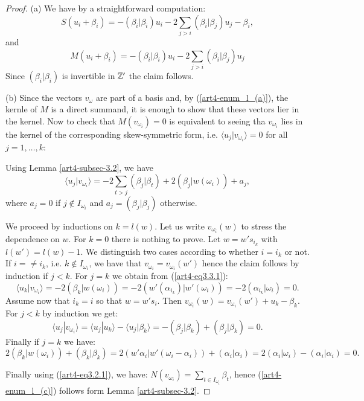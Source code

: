 \begin{proof}
(a) We have by a straightforward computation:
$$
S(u_{i} + \beta_{i}) = - (\beta_{i} | \beta_{i})u_{i}-2 \sum\limits_{j>i}(\beta_{i}|\beta_{j})u_{j}- \beta_{i},
$$
and
$$
M(u_{i} + \beta_{i}) = - (\beta_{i} | \beta_{i})u_{i}-2 \sum\limits_{j>i}(\beta_{i}|\beta_{j})u_{j}
$$
Since $(\beta_{i} | \beta_{i})$ is invertible in $\mathbb{Z}'$ the claim follows.

(b) Since the vectors $v_{\omega}$ are part of a basis and, by (\ref{art4-enum_l_(a)}), the kernle of $M$ is a direct summand, it is enough to show that these vectors lier in the kernel. Now to check that $M(v_{\omega_{i}}) =0$ is equivalent to seeing tha $v_{\omega_{i}}$ lies in the kernel of the corresponding skew-symmetric form, i.e. $\langle u_{j} | v_{\omega_{i}}\rangle = 0$ for all $j = 1,\ldots, k$:

Using Lemma \ref{art4-subsec-3.2}, we have
\begin{equation}
\langle u_{j} | v_{\omega_{i}}\rangle = -2\sum\limits_{t > j}(\beta_{j} | \beta_{t}) + 2(\beta_{j}| w(\omega_{i})) + a_{j},\label{art4-eq3.3.1}
\end{equation}
where $a_{j} = 0$ if $j \not\in I_{\omega_{i}}$ and $a_{j} = (\beta_{j} | \beta_{j})$ otherwise.

We proceed by inductions on $k= l(w)$. Let us write $v_{\omega_{i}}(w)$ to stress the dependence on $w$. For $k=0$ there is nothing to prove. Let $w=w's_{i_{k}}$ with $l(w')=l(w)-1$. We distinguish two cases according to whether $i=i_{k}$ or not. If $i=\neq i_{k}$, i.e. $k\not\in I_{\omega_{i}}$, we have that $v_{\omega_{i}} = v_{\omega_{i}}(w')$ hence the claim follows by induction if $j < k$. For $j =k$ we obtain from (\ref{art4-eq3.3.1}):
$$
\langle u_{k} | v_{\omega_{i}}\rangle = -2(\beta_{k} | w(\omega_{i})) = -2(w'(\alpha_{i_{k}}) | w'(\omega_{i})) = -2(\alpha_{i_{k}} | \omega_{i}) = 0.
$$
Assume now that $i_{k} = i$ so that $w=w's_{i}$. Then $v_{\omega_{i}}(w)=v_{\omega_{i}}(w') + u_{k} -\beta_{k}$. For $j < k$ by induction we get:
$$
\langle u_{j} | v_{\omega_{i}}\rangle = \langle u_{j} | u_{k}\rangle -\langle u_{j} | \beta_{k}\rangle = -(\beta_{j} | \beta_{k}) + (\beta_{j} | \beta_{k}) = 0.
$$
Finally if $j=k$ we have:
$$
2(\beta_{k}|w(\omega_{i})) + (\beta_{k}|\beta_{k}) = 2(w' \alpha_{i} | w' (\omega_{i}-\alpha_{i})) + (\alpha_{i} | \alpha_{i}) = 2(\alpha_{i} | \omega_{i})-(\alpha_{i}| \alpha_{i}) = 0.
$$

Finally using (\ref{art4-eq3.2.1}), we have: $N(v_{\omega_{i}}) = \sum_{t\in I_{\omega_{i}}} \beta_{t}$, hence (\ref{art4-enum_l_(c)}) follows form Lemma \ref{art4-subsec-3.2}.
\end{proof}

